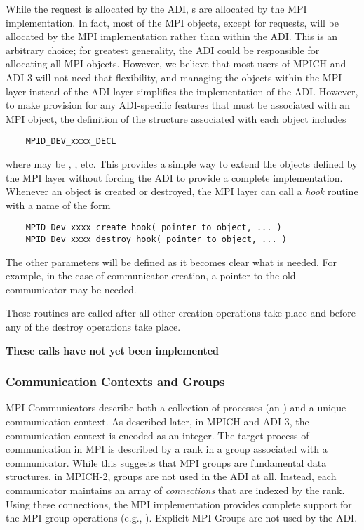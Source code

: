 While the request is allocated by the ADI, s are
allocated by the MPI implementation.  In fact, most of the MPI
objects, except for requests, will be allocated by the MPI
implementation rather than within the ADI.  This is an arbitrary
choice; for greatest generality, the ADI could be responsible for
allocating all MPI objects.  However, we believe that most users of
MPICH and ADI-3 will not need that flexibility, and managing the
objects within the MPI layer instead of the ADI layer simplifies the
implementation of the ADI.  However, to make provision for any
ADI-specific features that must be associated with an MPI object, the
definition of the structure associated with each object includes
\begin{verbatim}
    MPID_DEV_xxxx_DECL
\end{verbatim}
where  may be , , etc.  This
provides a simple way to extend the objects defined by the MPI layer
without forcing the ADI to provide a complete implementation.
Whenever an object is created or destroyed, the MPI layer can call a
\emph{hook} routine with a name of the form
\begin{verbatim}
    MPID_Dev_xxxx_create_hook( pointer to object, ... )
    MPID_Dev_xxxx_destroy_hook( pointer to object, ... )
\end{verbatim}
The other parameters will be defined as it becomes clear what is needed.  For
example, in the case of communicator creation, a pointer to the old
communicator may be needed.

These routines are called after all other creation operations take
place and before any of the destroy operations take place.

\textbf{These calls have not yet been implemented}

\subsubsection{Communication Contexts and Groups}

MPI Communicators describe both a collection of processes (an
) and a unique communication context.  As described
later, in MPICH and ADI-3, the communication context is encoded as an
integer.  The target process of communication in MPI is described by a
rank in a group associated with a communicator.  While this suggests
that MPI groups are fundamental data structures, in MPICH-2, groups
are not used in the ADI at all.  Instead, each communicator maintains
an array of \emph{connections} that are indexed by the rank.
Using these connections, the MPI implementation provides complete
support for the MPI group 
operations (e.g., ).  Explicit MPI Groups are
not used by the ADI.

